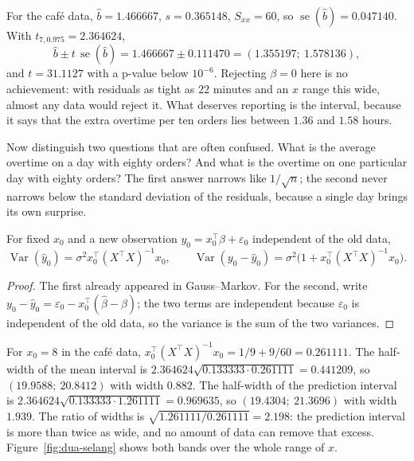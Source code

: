 For the café data, $\hat b=1.466667$, $s=0.365148$, $S_{xx}=60$, so
$\operatorname{se}(\hat b)=0.047140$. With $t_{7,0.975}=2.364624$,
\[
\hat b\pm t\,\operatorname{se}(\hat b)=1.466667\pm0.111470
=(1.355197;\ 1.578136),
\]
and $t=31.1127$ with a p-value below $10^{-6}$. Rejecting $\beta=0$ here is no achievement: with
residuals as tight as $22$ minutes and an $x$ range this wide, almost any data would reject it.
What deserves reporting is the interval, because it says that the extra overtime per ten orders
lies between $1.36$ and $1.58$ hours.

Now distinguish two questions that are often confused. What is the average overtime on a day
with eighty orders? And what is the overtime on one particular day with eighty orders? The first
answer narrows like $1/\sqrt n$; the second never narrows below the standard deviation of the
residuals, because a single day brings its own surprise.

\begin{proposisi}
For fixed $x_0$ and a new observation $y_0=x_0^{\top}\beta+\varepsilon_0$ independent of the old
data,
\[
\operatorname{Var}(\hat y_0)=\sigma^2x_0^{\top}(X^{\top}X)^{-1}x_0,
\qquad
\operatorname{Var}(y_0-\hat y_0)=\sigma^2\bigl(1+x_0^{\top}(X^{\top}X)^{-1}x_0\bigr).
\]
\end{proposisi}

\begin{proof}[Proof]
The first already appeared in Gauss--Markov. For the second, write
$y_0-\hat y_0=\varepsilon_0-x_0^{\top}(\hat\beta-\beta)$; the two terms are independent because
$\varepsilon_0$ is independent of the old data, so the variance is the sum of the two
variances.
\end{proof}

For $x_0=8$ in the café data, $x_0^{\top}(X^{\top}X)^{-1}x_0=1/9+9/60=0.261111$. The half-width
of the mean interval is $2.364624\sqrt{0.133333\cdot0.261111}=0.441209$, so
$(19.9588;\ 20.8412)$ with width $0.882$. The half-width of the prediction interval is
$2.364624\sqrt{0.133333\cdot1.261111}=0.969635$, so $(19.4304;\ 21.3696)$ with width $1.939$.
The ratio of widths is $\sqrt{1.261111/0.261111}=2.198$: the prediction interval is more than
twice as wide, and no amount of data can remove that excess. Figure~\ref{fig:dua-selang} shows
both bands over the whole range of $x$.


